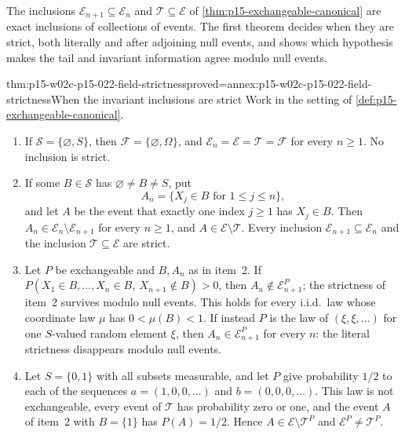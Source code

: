 The inclusions \(\mathcal E_{n+1}\subseteq\mathcal E_n\) and
\(\mathcal T\subseteq\mathcal E\) of
\cref{thm:p15-exchangeable-canonical} are exact inclusions of
collections of events. The first theorem decides when they are strict,
both literally and after adjoining null events, and shows which
hypothesis makes the tail and invariant information agree modulo null
events.

\begin{hbtheorem}{thm:p15-w02c-p15-022-field-strictness}{proved=annex:p15-w02c-p15-022-field-strictness}{When the invariant inclusions are strict}
Work in the setting of \cref{def:p15-exchangeable-canonical}.
\begin{enumerate}
\item If \(\mathcal S=\{\varnothing,S\}\), then
      \(\mathcal F=\{\varnothing,\Omega\}\), and
      \(\mathcal E_n=\mathcal E=\mathcal T=\mathcal F\) for every
      \(n\geq1\). No inclusion is strict.
\item If some \(B\in\mathcal S\) has \(\varnothing\neq B\neq S\), put
      \[
       A_n=\{X_j\in B\text{ for }1\leq j\leq n\},
      \]
      and let \(A\) be the event that exactly one index \(j\geq1\) has
      \(X_j\in B\).
      Then \(A_n\in\mathcal E_n\setminus\mathcal E_{n+1}\) for every
      \(n\geq1\), and \(A\in\mathcal E\setminus\mathcal T\). Every
      inclusion \(\mathcal E_{n+1}\subseteq\mathcal E_n\) and the
      inclusion \(\mathcal T\subseteq\mathcal E\) are strict.
\item Let \(P\) be exchangeable and \(B,A_n\) as in item~2. If
      \(P(X_1\in B,\ldots,X_n\in B,\ X_{n+1}\notin B)>0\), then
      \(A_n\notin\mathcal E_{n+1}^{P}\); the strictness of item~2
      survives modulo null events. This holds for every i.i.d.\ law
      whose coordinate law \(\mu\) has \(0<\mu(B)<1\). If instead \(P\)
      is the law of \((\xi,\xi,\ldots)\) for one \(S\)-valued random
      element \(\xi\), then \(A_n\in\mathcal E_{n+1}^{P}\) for every
      \(n\): the literal strictness disappears modulo null events.
\item Let \(S=\{0,1\}\) with all subsets measurable, and let \(P\) give
      probability \(1/2\) to each of the sequences
      \(a=(1,0,0,\ldots)\) and \(b=(0,0,0,\ldots)\). This law is not
      exchangeable, every event of \(\mathcal T\) has probability zero
      or one, and the event \(A\) of item~2 with \(B=\{1\}\) has
      \(P(A)=1/2\). Hence \(A\in\mathcal E\setminus\mathcal T^{P}\) and
      \(\mathcal E^{P}\neq\mathcal T^{P}\).
\end{enumerate}
\end{hbtheorem}

